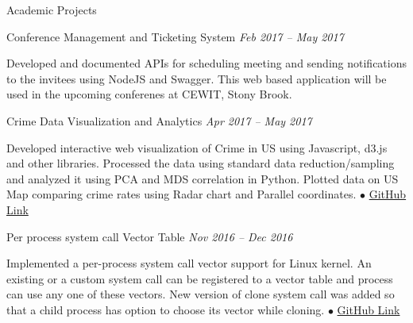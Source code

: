\documentclass{resume} %
\begin{document}
\begin{rSection}{Academic Projects}


\begin{rSubsection}{Conference Management and Ticketing System} {\emph {Feb 2017 -- May 2017}}{}{}
	\item Developed and documented APIs for scheduling meeting and sending notifications to the invitees using NodeJS and Swagger. This web based application will be used in the upcoming conferenes at CEWIT, Stony Brook.
\end{rSubsection}



\begin{rSubsection}{Crime Data Visualization and Analytics} {\emph {Apr 2017 -- May 2017}}{}{}
\item Developed interactive web visualization of Crime in US using Javascript, d3.js and other libraries. Processed the data using standard data reduction/sampling and analyzed it using PCA and MDS correlation in Python. Plotted data on US Map comparing crime rates using Radar chart and Parallel coordinates.
{\tiny$\bullet$}
\href{https://github.com/t-lohani/Crime-data-visualization-and-analytics}{GitHub Link}
\end{rSubsection}


\begin{rSubsection}{Per process system call Vector Table} {\emph {Nov 2016 -- Dec 2016}}{}{}
\item Implemented a per-process system call vector support for Linux kernel. An existing or a custom system call can be registered to a vector table and process can use any one of these vectors. New version of clone system call was added so that a child process has option to choose its vector while cloning.
{\tiny$\bullet$}
\href{https://github.com/t-lohani/Per-process-system-call}{GitHub Link}
\newline
\newline\newline\newline
\end{rSubsection}


\end{rSection}
\end{document}
